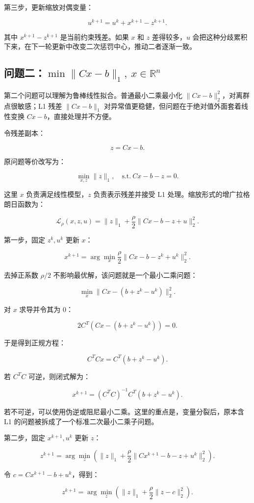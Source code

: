 \documentclass[UTF8,a4paper,12pt,fontset=none]{ctexart}
\begin{document}
第三步，更新缩放对偶变量：

\[
u^{k+1}=u^k+x^{k+1}-z^{k+1}.
\]

其中 $x^{k+1}-z^{k+1}$ 是当前约束残差。如果 $x$ 和 $z$ 差得较多，$u$ 会把这种分歧累积下来，在下一轮更新中改变二次惩罚中心，推动二者逐渐一致。

\subsection{问题二：$\min\|Cx-b\|_1,\ x\in\mathbb R^n$}

第二个问题可以理解为鲁棒线性拟合。普通最小二乘最小化 $\|Cx-b\|_2^2$，对离群点很敏感；L1 残差 $\|Cx-b\|_1$ 对异常值更稳健，但问题在于绝对值外面套着线性变换 $Cx-b$，直接处理并不方便。

令残差副本：

\[
z=Cx-b.
\]

原问题等价改写为：

\[
\min_{x,z}\|z\|_1,\quad \mathrm{s.t.}\ Cx-b-z=0.
\]

这里 $x$ 负责满足线性模型，$z$ 负责表示残差并接受 L1 处理。缩放形式的增广拉格朗日函数为：

\[
\mathcal L_\rho(x,z,u)=\|z\|_1+\frac{\rho}{2}\|Cx-b-z+u\|_2^2.
\]

第一步，固定 $z^k,u^k$ 更新 $x$：

\[
x^{k+1}=\arg\min_x\frac{\rho}{2}\|Cx-b-z^k+u^k\|_2^2.
\]

去掉正系数 $\rho/2$ 不影响最优解，该问题就是一个最小二乘问题：

\[
\min_x\|Cx-(b+z^k-u^k)\|_2^2.
\]

对 $x$ 求导并令其为 0：

\[
2C^T(Cx-(b+z^k-u^k))=0.
\]

于是得到正规方程：

\[
C^TCx=C^T(b+z^k-u^k).
\]

若 $C^TC$ 可逆，则闭式解为：

\[
x^{k+1}=(C^TC)^{-1}C^T(b+z^k-u^k).
\]

若不可逆，可以使用伪逆或阻尼最小二乘。这里的重点是，变量分裂后，原本含 L1 的问题被拆成了一个标准二次最小二乘子问题。

第二步，固定 $x^{k+1},u^k$ 更新 $z$：

\[
z^{k+1}=\arg\min_z\left(\|z\|_1+\frac{\rho}{2}\|Cx^{k+1}-b-z+u^k\|_2^2\right).
\]

令 $c=Cx^{k+1}-b+u^k$，得到：

\[
z^{k+1}=\arg\min_z\left(\|z\|_1+\frac{\rho}{2}\|z-c\|_2^2\right).
\]
\end{document}
